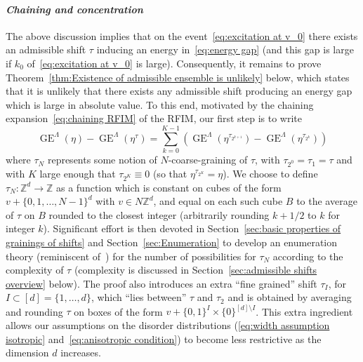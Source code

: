 \documentclass[11pt, reqno]{amsart}
\newcommand{\Z}{\mathbb{Z}}
\DeclareMathOperator{\GE}{GE}
\numberwithin{equation}{section}
\begin{document}
\paragraph{\emph{Chaining and concentration}} 
The above discussion implies that on the event~\eqref{eq:excitation at v_0} there exists an admissible shift $\tau$ inducing an energy  in~\eqref{eq:energy gap} (and this gap is large if $k_0$ of~\eqref{eq:excitation at v_0} is large). Consequently, it remains to prove Theorem~\ref{thm:Existence of admissible ensemble is unlikely} below, which states that it is unlikely that there exists any admissible shift producing an energy gap which is large in absolute value. To this end, motivated by the chaining expansion~\eqref{eq:chaining RFIM} of the RFIM, our first step is to write
\begin{equation}\label{eq:chaining disordered ferromagnet}
\GE^\Lambda(\eta) - \GE^\Lambda(\eta^\tau) = \sum_{k=0}^{K-1} \left(\GE^\Lambda(\eta^{\tau_{2^{k+1}}})-\GE^\Lambda(\eta^{\tau_{2^k}})\right)
\end{equation}
where $\tau_N$ represents some notion of $N$-coarse-graining of $\tau$, with $\tau_{2^0}=\tau_1=\tau$ and with $K$ large enough that $\tau_{2^K}\equiv 0$ (so that $\eta^{\tau_{2^K}}=\eta$). We choose to define $\tau_N:\Z^d\to\Z$ as a function which is constant on cubes of the form $v+\{0,1,\ldots,N-1\}^d$ with $v\in N\Z^d$, and equal on each such cube $B$ to the average of $\tau$ on $B$ rounded to the closest integer (arbitrarily rounding $k+1/2$ to $k$ for integer $k$). Significant effort is then devoted in Section~\ref{sec:basic properties of grainings of shifts} and Section~\ref{sec:Enumeration} to develop an enumeration theory (reminiscent of~\cite{FFS}) for the number of possibilities for $\tau_N$ according to the complexity of $\tau$ (complexity is discussed in Section~\ref{sec:admissible shifts overview} below). The proof also introduces an extra ``fine grained'' shift $\tau_I$, for $I\subset[d]=\{1,\ldots, d\}$, which ``lies between'' $\tau$ and $\tau_2$ and is obtained by averaging and rounding $\tau$ on boxes of the form $v+\{0,1\}^I\times\{0\}^{[d]\setminus I}$. This extra ingredient allows our assumptions on the disorder distributions (\eqref{eq:width assumption isotropic} and~\eqref{eq:anisotropic condition}) to become less restrictive as the dimension $d$ increases.
\end{document}
